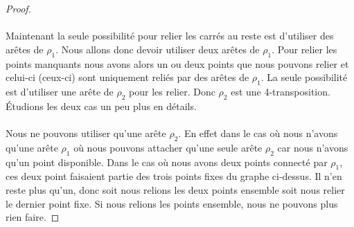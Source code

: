 \begin{proof}
\begin{figure}[H]
\begin{center}
      \caption{}
    \end{center}
  \end{figure}

  \paragraph{}
  Maintenant la seule possibilité pour relier les carrés au reste est d'utiliser des arêtes de $\rho_1$. Nous allons donc devoir utiliser deux arêtes de $\rho_1$. Pour relier les points manquants nous avons alors un ou deux points que nous pouvons relier et celui-ci (ceux-ci) sont uniquement reliés par des arêtes de $\rho_1$. La seule possibilité est d'utiliser une arête de $\rho_2$ pour les relier. Donc $\rho_2$ est une 4-transposition. Étudions les deux cas un peu plus en détails.

  \paragraph{}
  Nous ne pouvons utiliser qu'une arête $\rho_2$. En effet dans le cas où nous n'avons qu'une arête $\rho_1$ où nous pouvons attacher qu'une seule arête $\rho_2$ car nous n'avons qu'un point disponible. Dans le cas où nous avons deux points connecté par $\rho_1$, ces deux point faisaient partie des trois points fixes du graphe ci-dessus. Il n'en reste plus qu'un, donc soit nous relions les deux points ensemble soit nous relier le dernier point fixe. Si nous relions les points ensemble, nous ne pouvons plus rien faire.


\end{proof}
